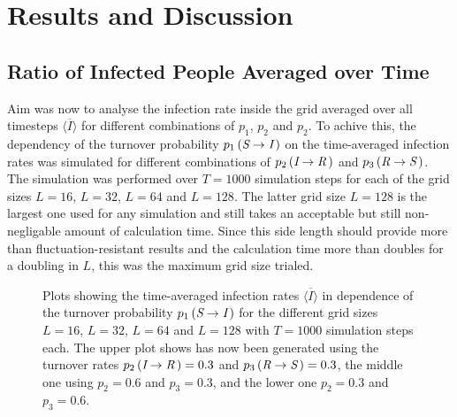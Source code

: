 \section{Results and Discussion}

\subsection{Ratio of Infected People Averaged over Time}

Aim was now to analyse the infection rate inside the grid averaged over all timesteps $\overline{\langle I\rangle}$ for different combinations of $p_1$, $p_2$ and $p_2$. To achive this, the dependency of the 
turnover probability $p_1\left(\textit{S}\rightarrow\textit{I}\,\right)$ on the time-averaged infection rates was simulated for different combinations of $p_2\left(\textit{I}\rightarrow\textit{R}\,\right)$
and $p_3\left(\textit{R}\rightarrow\textit{S}\,\right)$. The simulation was performed over $T=1000$ simulation steps for each of the grid sizes $L=16$, $L=32$, $L=64$ and $L=128$.
The latter grid size $L=128$ is the largest one used for any simulation and still takes an acceptable but still non-negligable amount of calculation time.
Since this side length should provide more than fluctuation-resistant results and the calculation time more than doubles for a doubling in $L$, this was the maximum grid size trialed.

\begin{figure}[ht]
    \centering
    \resizebox{\textwidth}{!}{}
    \caption{Plots showing the time-averaged infection rates $\overline{\langle I\rangle}$ in dependence of the turnover probability $p_1\left(\textit{S}\rightarrow\textit{I}\,\right)$
    for the different grid sizes $L=16$, $L=32$, $L=64$ and $L=128$ with $T=1000$ simulation steps each. The upper plot shows has now been generated using the turnover rates 
    $p_2\left(\textit{I}\rightarrow\textit{R}\,\right)=0.3$ and $p_3\left(\textit{R}\rightarrow\textit{S}\,\right)=0.3$, 
    the middle one using $p_2=0.6$ and $p_3=0.3$, and the lower one $p_2=0.3$ and $p_3=0.6$.}\label{fig:res_dis_avg_inf_over_p1}
\end{figure}

